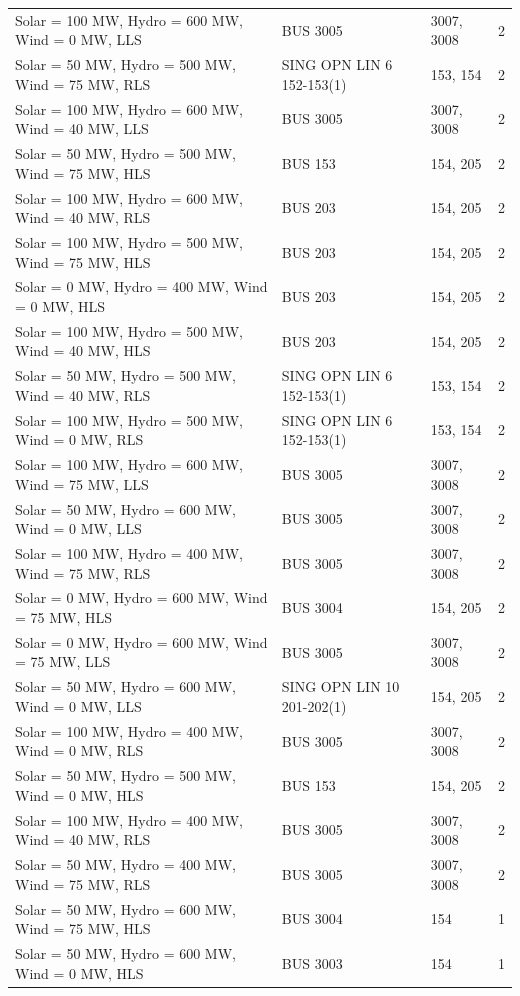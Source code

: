 \documentclass[10pt]{report}
\begin{document}
\begin{table}[H]
{\begin{tabular}{llp{8cm}r}
Solar = 100 MW, Hydro = 600 MW, Wind = 0 MW, LLS & BUS 3005 & 3007, 3008 & 2 \\
Solar = 50 MW, Hydro = 500 MW, Wind = 75 MW, RLS & SING OPN LIN   6 152-153(1) & 153, 154 & 2 \\
Solar = 100 MW, Hydro = 600 MW, Wind = 40 MW, LLS & BUS 3005 & 3007, 3008 & 2 \\
Solar = 50 MW, Hydro = 500 MW, Wind = 75 MW, HLS & BUS 153 & 154, 205 & 2 \\
Solar = 100 MW, Hydro = 600 MW, Wind = 40 MW, RLS & BUS 203 & 154, 205 & 2 \\
Solar = 100 MW, Hydro = 500 MW, Wind = 75 MW, HLS & BUS 203 & 154, 205 & 2 \\
Solar = 0 MW, Hydro = 400 MW, Wind = 0 MW, HLS & BUS 203 & 154, 205 & 2 \\
Solar = 100 MW, Hydro = 500 MW, Wind = 40 MW, HLS & BUS 203 & 154, 205 & 2 \\
Solar = 50 MW, Hydro = 500 MW, Wind = 40 MW, RLS & SING OPN LIN   6 152-153(1) & 153, 154 & 2 \\
Solar = 100 MW, Hydro = 500 MW, Wind = 0 MW, RLS & SING OPN LIN   6 152-153(1) & 153, 154 & 2 \\
Solar = 100 MW, Hydro = 600 MW, Wind = 75 MW, LLS & BUS 3005 & 3007, 3008 & 2 \\
Solar = 50 MW, Hydro = 600 MW, Wind = 0 MW, LLS & BUS 3005 & 3007, 3008 & 2 \\
Solar = 100 MW, Hydro = 400 MW, Wind = 75 MW, RLS & BUS 3005 & 3007, 3008 & 2 \\
Solar = 0 MW, Hydro = 600 MW, Wind = 75 MW, HLS & BUS 3004 & 154, 205 & 2 \\
Solar = 0 MW, Hydro = 600 MW, Wind = 75 MW, LLS & BUS 3005 & 3007, 3008 & 2 \\
Solar = 50 MW, Hydro = 600 MW, Wind = 0 MW, LLS & SING OPN LIN   10 201-202(1) & 154, 205 & 2 \\
Solar = 100 MW, Hydro = 400 MW, Wind = 0 MW, RLS & BUS 3005 & 3007, 3008 & 2 \\
Solar = 50 MW, Hydro = 500 MW, Wind = 0 MW, HLS & BUS 153 & 154, 205 & 2 \\
Solar = 100 MW, Hydro = 400 MW, Wind = 40 MW, RLS & BUS 3005 & 3007, 3008 & 2 \\
Solar = 50 MW, Hydro = 400 MW, Wind = 75 MW, RLS & BUS 3005 & 3007, 3008 & 2 \\
Solar = 50 MW, Hydro = 600 MW, Wind = 75 MW, HLS & BUS 3004 & 154 & 1 \\
Solar = 50 MW, Hydro = 600 MW, Wind = 0 MW, HLS & BUS 3003 & 154 & 1 \\

\end{tabular}}
\end{table}
\end{document}
